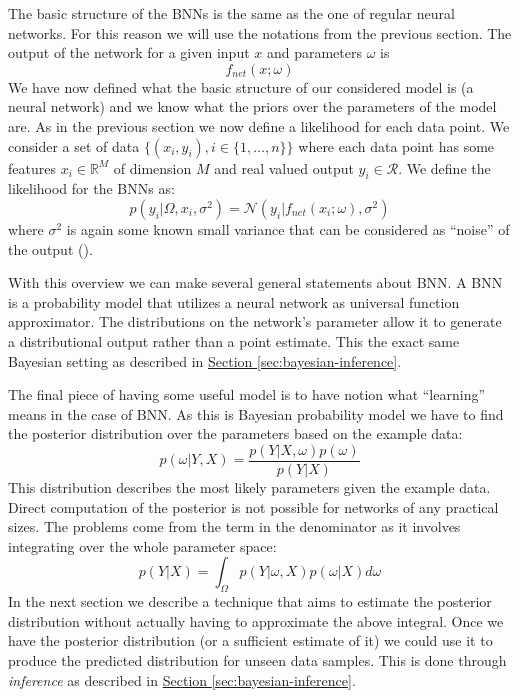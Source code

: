 \documentclass[12pt,a4paper,twoside]{scrartcl}
\numberwithin{equation}{section}
\newcommand{\refsec}[1]{\hyperref[#1]{Section \ref*{#1}}}
\begin{document}
The basic structure of the BNNs is the same as the one of regular neural networks. For this reason we will use the notations from the previous section. The output of the network for a given input \(x\) and parameters \(\omega\) is
\begin{equation}
   f_{net}(x;\omega)
\end{equation}
We have now defined what the basic structure of our considered model is (a neural network) and we know what the priors over the parameters of the model are. As in the previous section we now define a likelihood for each data point. We consider a set of data \(\{(x_i, y_i), i\in\{1,\ldots ,n\} \}\) where each data point has some features \(x_i\in\mathbb{R}^M\) of dimension \(M\) and real valued output \(y_i\in\mathcal{R}\). We define the likelihood for the BNNs as:
\begin{equation}
  p(y_i|\Omega, x_i, \sigma^2) = \mathcal{N}(y_i |f_{net}(x_i;\omega), \sigma^2)
\end{equation}
where \(\sigma^{\text{2}}\) is again some known small variance that can be considered as ``noise'' of the output (\cite{gal2016}).

With this overview we can make several general statements about BNN. A BNN is a probability model that utilizes a neural network as universal function approximator. The distributions on the network's parameter allow it to generate a distributional output rather than a point estimate. This the exact same Bayesian setting as described in \refsec{sec:bayesian-inference}. 

The final piece of having some useful model is to have notion what ``learning'' means in the case of BNN. As this is Bayesian probability model we have to find the posterior distribution over the parameters based on the example data:
\begin{equation}
  p(\omega|Y,X)=\frac{p(Y|X,\omega)p(\omega)}{p(Y|X)}
\end{equation}
This distribution describes the most likely parameters given the example data. Direct computation of the posterior is not possible for networks of any practical sizes. The problems come from the term in the denominator as it involves integrating over the whole parameter space:
\begin{equation}
  p(Y|X) = \int_{\Omega} p(Y|\omega , X)p(\omega|X)d \omega
\end{equation}
In the next section we describe a technique that aims to estimate the posterior distribution without actually having to approximate the above integral. Once we have the posterior distribution (or a sufficient estimate of it) we could use it to produce the predicted distribution for unseen data samples. This is done through \emph{inference} as described in \refsec{sec:bayesian-inference}.
\end{document}

